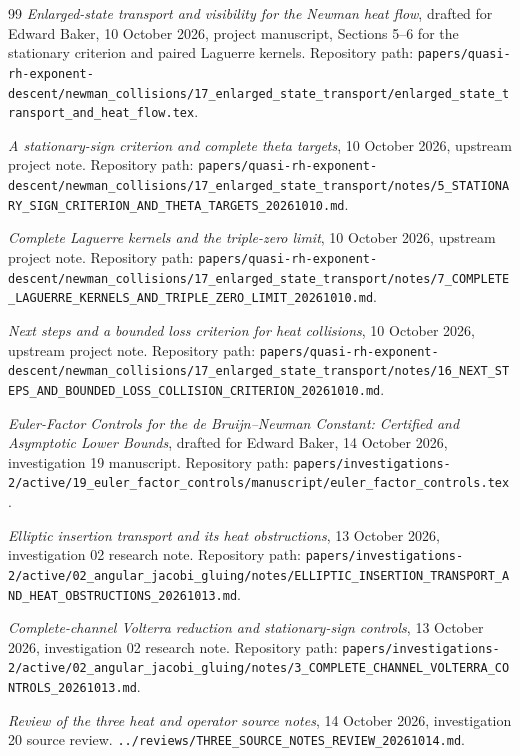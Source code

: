 \documentclass[11pt]{article}
\numberwithin{equation}{section}
\theoremstyle{definition}
\theoremstyle{remark}
\begin{document}
\begin{thebibliography}{99}
\emph{Enlarged-state transport and visibility for the Newman heat flow},
drafted for Edward Baker, 10 October 2026, project manuscript,
Sections 5--6 for the stationary criterion and paired Laguerre kernels.
Repository path:
\nolinkurl{papers/quasi-rh-exponent-descent/newman_collisions/17_enlarged_state_transport/enlarged_state_transport_and_heat_flow.tex}.

\emph{A stationary-sign criterion and complete theta targets},
10 October 2026, upstream project note.
Repository path:
\nolinkurl{papers/quasi-rh-exponent-descent/newman_collisions/17_enlarged_state_transport/notes/5_STATIONARY_SIGN_CRITERION_AND_THETA_TARGETS_20261010.md}.

\emph{Complete Laguerre kernels and the triple-zero limit},
10 October 2026, upstream project note.
Repository path:
\nolinkurl{papers/quasi-rh-exponent-descent/newman_collisions/17_enlarged_state_transport/notes/7_COMPLETE_LAGUERRE_KERNELS_AND_TRIPLE_ZERO_LIMIT_20261010.md}.

\emph{Next steps and a bounded loss criterion for heat collisions},
10 October 2026, upstream project note.
Repository path:
\nolinkurl{papers/quasi-rh-exponent-descent/newman_collisions/17_enlarged_state_transport/notes/16_NEXT_STEPS_AND_BOUNDED_LOSS_COLLISION_CRITERION_20261010.md}.

\emph{Euler-Factor Controls for the de Bruijn--Newman Constant:
Certified and Asymptotic Lower Bounds}, drafted for Edward Baker,
14 October 2026, investigation 19 manuscript.
Repository path:
\nolinkurl{papers/investigations-2/active/19_euler_factor_controls/manuscript/euler_factor_controls.tex}.

\emph{Elliptic insertion transport and its heat obstructions},
13 October 2026, investigation 02 research note.
Repository path:
\nolinkurl{papers/investigations-2/active/02_angular_jacobi_gluing/notes/ELLIPTIC_INSERTION_TRANSPORT_AND_HEAT_OBSTRUCTIONS_20261013.md}.

\emph{Complete-channel Volterra reduction and stationary-sign controls},
13 October 2026, investigation 02 research note.
Repository path:
\nolinkurl{papers/investigations-2/active/02_angular_jacobi_gluing/notes/3_COMPLETE_CHANNEL_VOLTERRA_CONTROLS_20261013.md}.

\emph{Review of the three heat and operator source notes},
14 October 2026, investigation 20 source review.
\nolinkurl{../reviews/THREE_SOURCE_NOTES_REVIEW_20261014.md}.


\end{thebibliography}
\end{document}
